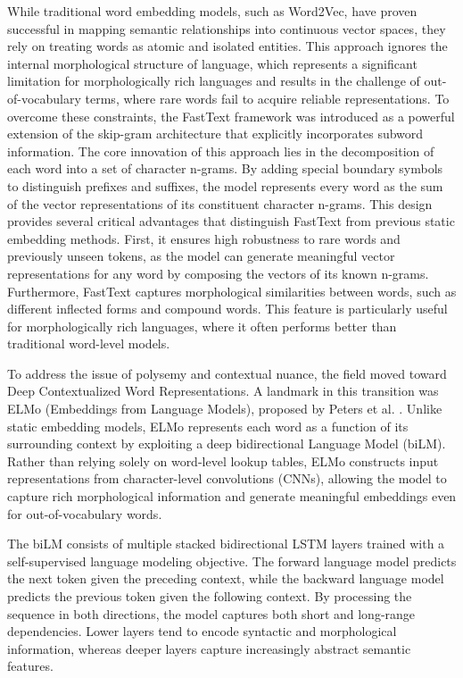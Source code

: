 While traditional word embedding models, such as Word2Vec, have proven successful in mapping semantic relationships into continuous vector spaces, they rely on treating words as atomic and isolated entities. This approach ignores the internal morphological structure of language, which represents a significant limitation for morphologically rich languages and results in the challenge of out-of-vocabulary terms, where rare words fail to acquire reliable representations. To overcome these constraints, the FastText framework \cite{DBLP:journals/corr/BojanowskiGJM16} was introduced as a powerful extension of the skip-gram architecture that explicitly incorporates subword information. The core innovation of this approach lies in the decomposition of each word into a set of character n-grams. By adding special boundary symbols to distinguish prefixes and suffixes, the model represents every word as the sum of the vector representations of its constituent character n-grams. This design provides several critical advantages that distinguish FastText from previous static embedding methods. First, it ensures high robustness to rare words and previously unseen tokens, as the model can generate meaningful vector representations for any word by composing the vectors of its known n-grams. 
Furthermore, FastText captures morphological similarities between words, such as different inflected forms and compound words. This feature is particularly useful for morphologically rich languages, where it often performs better than traditional word-level models.



To address the issue of polysemy and contextual nuance, the field moved toward Deep Contextualized Word Representations. A landmark in this transition was ELMo (Embeddings from Language Models), proposed by Peters et al. \cite{peters-etal-2018-deep}. Unlike static embedding models, ELMo represents each word as a function of its surrounding context by exploiting a deep bidirectional Language Model (biLM). Rather than relying solely on word-level lookup tables, ELMo constructs input representations from character-level convolutions (CNNs), allowing the model to capture rich morphological information and generate meaningful embeddings even for out-of-vocabulary words.

The biLM consists of multiple stacked bidirectional LSTM layers trained with a self-supervised language modeling objective. The forward language model predicts the next token given the preceding context, while the backward language model predicts the previous token given the following context. By processing the sequence in both directions, the model captures both short and long-range dependencies. Lower layers tend to encode syntactic and morphological information, whereas deeper layers capture increasingly abstract semantic features.

